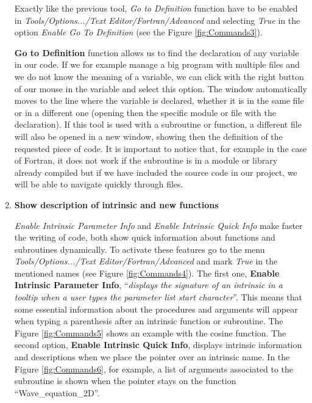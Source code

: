 \begin{enumerate}
    Exactly like the previous tool, \textit{Go to Definition} function have to be enabled in \textit{Tools/Options.../Text Editor/Fortran/Advanced} and selecting \textit{True} in the option \textit{Enable Go To Definition} (see the Figure \ref{fig:Commands3}).
    
	\textbf{Go to Definition} function allows us to find the declaration of any variable in our code. If we for example manage a big program with multiple files and we do not know the meaning of a variable, we can click with the right button of our mouse in the variable and select this option. The window automatically moves to the line where the variable is declared, whether it is in the same file or in a different one (opening then the specific module or file with the declaration). If this tool is used with a subroutine or function, a different file will also be opened in a new window, showing then the definition of the requested piece of code. It is important to notice that, for example in the case of Fortran, it does not work if the subroutine is in a module or library already compiled but if we have included the source code in our project, we will be able to navigate quickly through files.
    
    
    \item \textbf{Show description of intrinsic and new functions}
	
	\textit{Enable Intrinsic Parameter Info} and \textit{Enable Intrinsic Quick Info} make faster the writing of code, both show quick information about functions and subroutines dynamically. To activate these features go to the menu \textit{Tools/Options.../Text Editor/Fortran/Advanced} and mark \textit{True} in the mentioned names (see Figure \ref{fig:Commands4}). The first one, \textbf{Enable Intrinsic Parameter Info}, ``\textit{displays the signature of an intrinsic in a tooltip when a user types the parameter list start character}''. This means that some essential information about the procedures and arguments will appear when typing a parenthesis after an intrinsic function or subroutine. The Figure \ref{fig:Commands5} shows an example with the cosine function. The second option, \textbf{Enable Intrinsic Quick Info}, displays intrinsic information and descriptions when we place the pointer over an intrinsic name. In the Figure \ref{fig:Commands6}, for example, a list of arguments associated to the subroutine is shown when the pointer stays on the function ``Wave\_equation\_2D''.
	

\end{enumerate}
